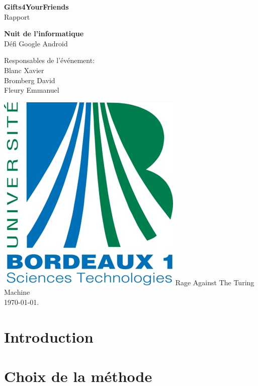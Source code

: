 \documentclass[a4paper,francais,titlepage]{report}
\begin{document}
\pagestyle{fancy}

\begin{titlepage}
 \begin{center}
	\vspace*{3.5cm}
	\Large \textbf{Gifts4YourFriends} \\
	\vspace{0.2cm}
	\small Rapport
	\vspace{2cm}

	\huge \textbf{Nuit de l'informatique} \\
	\vspace{0.3cm}
	\large {Défi Google Android}
	\vspace{1.5cm}
 \end{center}
 
 \begin{flushleft}
	\normalsize {\hspace{6cm}Responsables de l'événement: \\ 
				 \hspace{7.0cm} Blanc Xavier \\
				 \hspace{6.7cm} Bromberg David \\
				 \hspace{6.6cm} Fleury Emmanuel}
	\vspace{2cm}
 \end{flushleft}
 
   \begin{center}
   \includegraphics[scale=0.3]{logo_bx1.jpg}
   	\vfill 
   	\vspace{2cm}
	\normalsize {Rage Against The Turing Machine\\}
	\vspace{1.5cm} 
	{\today}.
 \end{center}
\end{titlepage}

\section{Introduction}

\section{Choix de la méthode}
\end{document}

